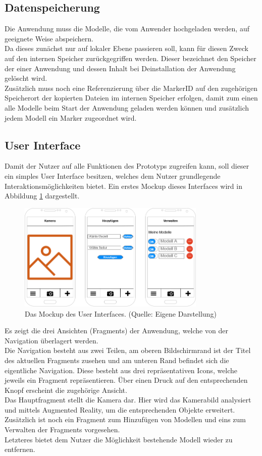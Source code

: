 \subsection{Datenspeicherung}
Die Anwendung muss die Modelle, die vom Anwender hochgeladen werden, auf geeignete Weise abspeichern.\\
Da dieses zunächst nur auf lokaler Ebene passieren soll, kann für diesen Zweck auf den internen Speicher zurückgegriffen werden. Dieser bezeichnet den Speicher der einer Anwendung und dessen Inhalt bei Deinstallation der Anwendung gelöscht wird. \\
Zusätzlich muss noch eine Referenzierung über die MarkerID auf den zugehörigen Speicherort der kopierten Dateien im internen Speicher erfolgen, damit zum einen alle Modelle beim Start der Anwendung geladen werden können und zusätzlich jedem Modell ein Marker zugeordnet wird.
 
\subsection{User Interface}
Damit der Nutzer auf alle Funktionen des Prototyps zugreifen kann, soll dieser ein simples User Interface besitzen, welches dem Nutzer grundlegende Interaktionsmöglichkeiten bietet. Ein erstes Mockup dieses Interfaces wird in Abbildung \ref{fig:ui-mockup} dargestellt.
\begin{figure}[h!]
\centering
\includegraphics[width=0.8\textwidth]{Abbildungen/ui-mockup.png}
\caption[UI Mockup]{Das Mockup des User Interfaces. (Quelle: Eigene Darstellung)}
\label{fig:ui-mockup}
\end{figure}
Es zeigt die drei Ansichten (Fragments) der Anwendung, welche von der Navigation überlagert werden. \\
Die Navigation besteht aus zwei Teilen, am oberen Bildschirmrand ist der Titel des aktuellen Fragments zusehen und am unteren Rand befindet sich die eigentliche Navigation. Diese besteht aus drei repräsentativen Icons, welche jeweils ein Fragment repräsentieren. Über einen Druck auf den entsprechenden Knopf erscheint die zugehörige Ansicht.\\
Das Hauptfragment stellt die Kamera dar. Hier wird das Kamerabild analysiert und mittels Augmented Reality, um die entsprechenden Objekte erweitert. Zusätzlich ist noch ein Fragment zum Hinzufügen von Modellen und eins zum Verwalten der Fragments vorgesehen.\\
Letzteres bietet dem Nutzer die Möglichkeit bestehende Modell wieder zu entfernen.
